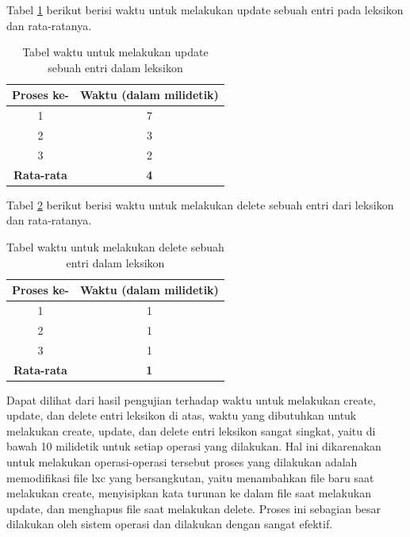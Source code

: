 Tabel \ref{tabel-waktu-update} berikut berisi waktu untuk melakukan update sebuah entri pada leksikon dan rata-ratanya.

\begin{table}[H]
\centering
\begin{tabular}{|c|c|}
\hline
\textbf{Proses ke-} & \textbf{Waktu} (dalam milidetik) \\
\hline
1&7\\
2&3\\
3&2\\
\hline
\textbf{Rata-rata} & \textbf{4}\\
\hline
\end{tabular}
\caption{Tabel waktu untuk melakukan update sebuah entri dalam leksikon} 
\label{tabel-waktu-update}
\end{table}

Tabel \ref{tabel-waktu-delete} berikut berisi waktu untuk melakukan delete sebuah entri dari leksikon dan rata-ratanya.

\begin{table}[H]
\centering
\begin{tabular}{|c|c|}
\hline
\textbf{Proses ke-} & \textbf{Waktu} (dalam milidetik) \\
\hline
1&1\\
2&1\\
3&1\\
\hline
\textbf{Rata-rata} & \textbf{1}\\
\hline
\end{tabular}
\caption{Tabel waktu untuk melakukan delete sebuah entri dalam leksikon} 
\label{tabel-waktu-delete}
\end{table}

Dapat dilihat dari hasil pengujian terhadap waktu untuk melakukan create, update, dan delete entri leksikon di atas, waktu yang dibutuhkan untuk melakukan create, update, dan delete entri leksikon sangat singkat, yaitu di bawah 10 milidetik untuk setiap operasi yang dilakukan. Hal ini dikarenakan untuk melakukan operasi-operasi tersebut proses yang dilakukan adalah memodifikasi file lxc yang bersangkutan, yaitu menambahkan file baru saat melakukan create, menyisipkan kata turunan ke dalam file saat melakukan update, dan menghapus file saat melakukan delete. Proses ini sebagian besar dilakukan oleh sistem operasi dan dilakukan dengan sangat efektif.